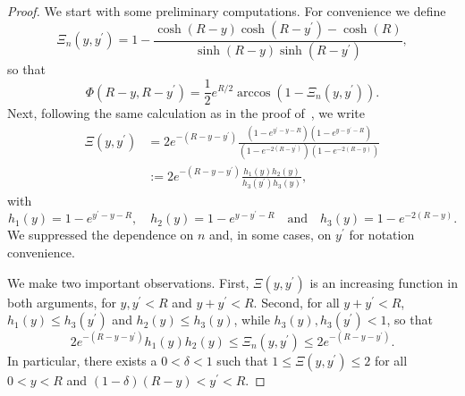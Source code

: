 \begin{proof}
We start with some preliminary computations. For convenience we define
\[
	\Xi_n(y,y^\prime) = 1 - \frac{\cosh(R- y)\cosh(R-y^\prime) - \cosh(R)}{\sinh(R - y) \sinh(R - y^\prime)},
\]
so that
\[
	\Phi(R -y, R - y^\prime) = \frac{1}{2}e^{R/2} \arccos\left(1 - \Xi_n(y,y^\prime)\right).
\]
Next, following the same calculation as in the proof of~\cite[Lemma 28]{fountoulakis2018law}, we write
\begin{align*}
	\Xi(y,y^\prime)
	&= 2 e^{-(R - y - y^\prime)} \frac{\left(1 - e^{y^\prime - y - R}\right)\left(1 - e^{y - y^\prime - R}\right)}
		{\left(1 - e^{-2(R - y^\prime)}\right)\left(1 - e^{-2(R- y)}\right)}\\
	&:= 2 e^{-(R - y - y^\prime)} \frac{h_1(y) h_2(y)}{h_3(y^\prime) h_3(y)},
\end{align*}
with
\[
	h_1(y) = 1 - e^{y^\prime - y - R}, \quad h_2(y) = 1 - e^{y - y^\prime - R}
	\quad \text{and} \quad h_3(y) = 1 - e^{-2(R- y)}.
\]
We suppressed the dependence on $n$ and, in some cases, on $y^\prime$ for notation convenience.

We make two important observations. First, $\Xi(y,y^\prime)$ is an increasing function in both arguments, for $y, y^\prime < R$ and $y + y^\prime < R$. Second, for all $y + y^\prime < R$, $h_1(y) \le h_3(y^\prime)$ and $h_2(y) \le h_3(y)$, while $h_3(y), h_3(y^\prime) < 1$, so that
\begin{equation}\label{eq:derivative_hyp_ball_Xi_bounds}
	2 e^{-(R - y - y^\prime)}h_1(y) h_2(y) \le \Xi_n(y,y^\prime) \le 2 e^{-(R - y - y^\prime)}.
\end{equation}
In particular, there exists a $0 < \delta < 1$ such that $1 \le \Xi(y,y^\prime) \le 2$ for all $0 < y < R$ and $(1-\delta)(R-y) < y^\prime < R$.


\end{proof}
